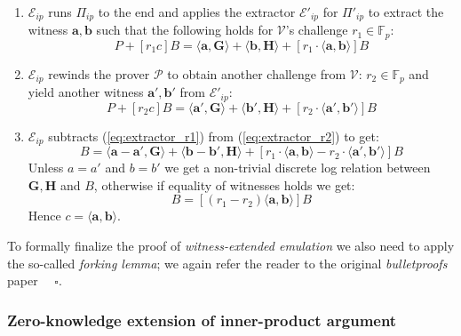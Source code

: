 \documentclass[../lecture-notes-148x210.tex]{subfiles}
\begin{document}
\begin{enumerate}
    \item $\mathcal{E}_{ip}$ runs $\Pi_{ip}$ to the end and applies the extractor $\mathcal{E}'_{ip}$ for $\Pi'_{ip}$ to extract the witness $\mathbf{a,b}$ such that the following holds for $\mathcal{V}$'s challenge $r_1 \in \mathbb{F}_p$:
        \begin{equation}
            P + [r_1c]B = \langle \mathbf{a,G} \rangle + \langle \mathbf{b,H} \rangle + [r_1 \cdot \langle \mathbf{a,b} \rangle]B
            \label{eq:extractor_r1}
        \end{equation}
    \item $\mathcal{E}_{ip}$ rewinds the prover $\mathcal{P}$ to obtain another challenge from $\mathcal{V}$: $r_2 \in \mathbb{F}_p$ and yield another witness $\mathbf{a',b'}$ from $\mathcal{E}'_{ip}$:
        \begin{equation}
            P + [r_2c]B = \langle \mathbf{a',G} \rangle + \langle \mathbf{b',H} \rangle + [r_2 \cdot \langle \mathbf{a',b'} \rangle]B
            \label{eq:extractor_r2}
        \end{equation}
        
    \item $\mathcal{E}_{ip}$ subtracts (\ref{eq:extractor_r1}) from (\ref{eq:extractor_r2}) to get:
        \begin{equation}
            [c(r_1 - r_2)]B = \langle \mathbf{a-a',G} \rangle + \langle \mathbf{b-b',H} \rangle + [r_1 \cdot \langle \mathbf{a,b} \rangle - r_2 \cdot \langle \mathbf{a',b'} \rangle]B
        \end{equation}
        Unless $a = a'$ and $b = b'$ we get a non-trivial discrete log relation between $\mathbf{G,H}$ and $B$, otherwise if equality of witnesses holds we get:
        \begin{equation}
            [(r_1 - r_2)c]B = [(r_1 - r_2) \langle \mathbf{a,b} \rangle]B
        \end{equation}
        Hence $c = \langle \mathbf{a,b} \rangle$.
\end{enumerate}

To formally finalize the proof of \textit{witness-extended emulation} we also need to apply the so-called \textit{forking lemma}; we again refer the reader to the original \textit{bulletproofs} paper \cite{bulletproofs} $\quad \square$.

\subsubsection{Zero-knowledge extension of inner-product argument}\label{subsection:alternative-zk-ip}
\end{document}
